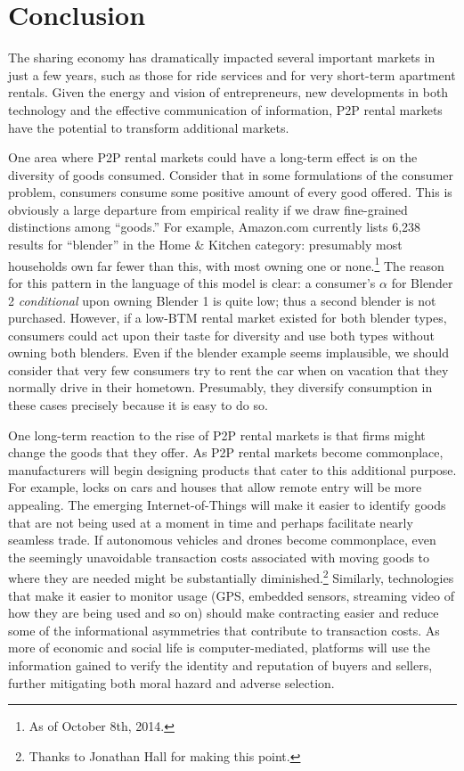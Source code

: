 \documentclass[11pt]{article}
\begin{document}
\section{Conclusion} 

The sharing economy has dramatically impacted several important markets in just a few years, such as those for ride services and for very short-term apartment rentals.
Given the energy and vision of entrepreneurs, new developments in both technology and the effective communication of information, P2P rental markets have the potential to transform additional markets.

One area where P2P rental markets could have a long-term effect is on the diversity of goods consumed. 
Consider that in some formulations of the consumer problem, consumers consume some positive amount of every good offered.
This is obviously a large departure from empirical reality if we draw fine-grained distinctions among ``goods.'' 
For example, Amazon.com currently lists 6,238 results for ``blender'' in the Home \& Kitchen category: 
presumably most households own far fewer than this, with most owning one or none.\footnote{As of October 8th, 2014.}
The reason for this pattern in the language of this model is clear: 
a consumer's $\alpha$ for Blender 2 \emph{conditional} upon owning Blender 1 is quite low;
thus a second blender is not purchased.
However, if a low-BTM rental market existed for both blender types, consumers could act upon their taste for diversity and use both types without owning both blenders. 
Even if the blender example seems implausible, we should consider that very few consumers try to rent the car when on vacation that they normally drive in their hometown. 
Presumably, they diversify consumption in these cases precisely because it is easy to do so. 

One long-term reaction to the rise of P2P rental markets is that firms might change the goods that they offer. 
As P2P rental markets become commonplace, manufacturers will begin designing products that cater to this additional purpose. 
For example, locks on cars and houses that allow remote entry will be more appealing. 
The emerging Internet-of-Things will make it easier to identify goods that are not being used at a moment in time and perhaps facilitate nearly seamless trade.
If autonomous vehicles and drones become commonplace, even the seemingly unavoidable transaction costs associated with moving goods to where they are needed might be substantially diminished.\footnote{
  Thanks to Jonathan Hall for making this point.
}
Similarly, technologies that make it easier to monitor usage (GPS, embedded sensors, streaming video of how they are being used and so on) should make contracting easier and reduce some of the informational asymmetries that contribute to transaction costs. 
As more of economic and social life is computer-mediated, platforms will use the information gained to verify the identity and reputation of buyers and sellers, further mitigating both moral hazard and adverse selection.  
\end{document}
